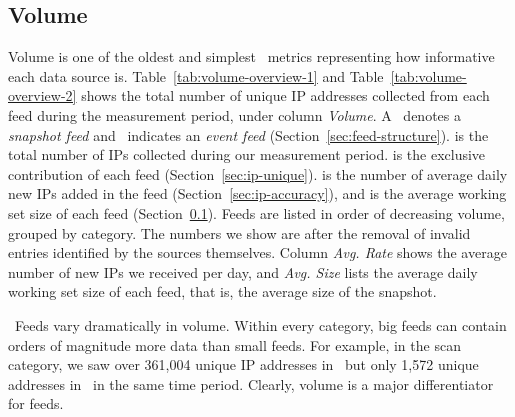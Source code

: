 \subsection{Volume}
\label{sec:ip-volume}

Volume is one of the oldest and simplest \ti\ metrics representing how informative
each data source is. Table~\ref{tab:volume-overview-1} and Table~\ref{tab:volume-overview-2} shows the total number of unique IP addresses
collected from each feed during the measurement period, under column \emph{Volume}. A \snapfeedsym\ denotes a \textit{snapshot feed}
and \deltafeedsym\ indicates an \textit{event feed} (Section~\ref{sec:feed-structure}).
 is the total number of IPs collected during our measurement period.
 is the exclusive contribution of each feed (Section~\ref{sec:ip-unique}).
 is the number of average daily new IPs added in the feed (Section~\ref{sec:ip-accuracy}), and
 is the average working set size of each feed (Section~\ref{sec:ip-volume}).
Feeds are listed in order of decreasing volume, grouped by category.
The numbers we show are after the removal of invalid entries identified
by the sources themselves. Column \emph{Avg. Rate} shows the average number of
new IPs we received per day, and \emph{Avg. Size} lists the average daily
working set size of each feed, that is, the average size of the snapshot.

\finding\ Feeds vary dramatically in volume. Within every category, big feeds can contain
orders of magnitude more data than small feeds. For example, in the scan category, we saw
over 361,004 unique IP addresses in \feeddshield\ but only 1,572 unique addresses
in \feedTSAnalyst\ in the same time period. Clearly, volume is a major differentiator
for feeds. %




